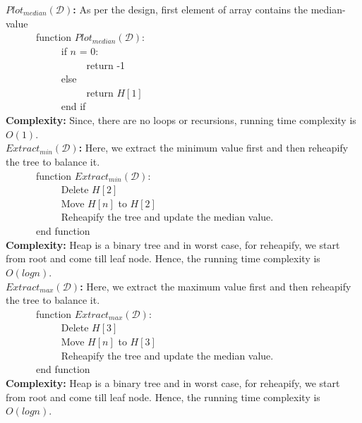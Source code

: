 \documentclass[12pt]{article}
\begin{document}
\begin{enumerate}
\begin{itemize}
\textbf{$Plot_{median}(\mathcal{D})$:} As per the design, first element of array contains the median-value\\
\verb|		|function $Plot_{median}(\mathcal{D})$:\\
\verb|		|\verb|		|if $n$ = 0:\\
\verb|		|\verb|		|\verb|		|return -1\\
\verb|		|\verb|		|else \\
\verb|		|\verb|		|\verb|		|return $H[1]$\\
\verb|		|\verb|		|end if\\
\textbf{Complexity:} Since, there are no loops or recursions, running time complexity is $O(1)$.\\

\textbf{$Extract_{min}(\mathcal{D})$:} Here, we extract the minimum value first and then reheapify the tree to balance it.\\
\verb|		|function $Extract_{min}(\mathcal{D})$:\\
\verb|		|\verb|		|Delete $H[2]$\\
\verb|		|\verb|		|Move $H[n]$ to $H[2]$\\
\verb|		|\verb|		|Reheapify the tree and update the median value.\\
\verb|		|end function\\
\textbf{Complexity:} Heap is a binary tree and in worst case, for reheapify, we start from root and come till leaf node. Hence, the running time complexity is $O(logn)$.\\

\textbf{$Extract_{max}(\mathcal{D})$:} Here, we extract the maximum value first and then reheapify the tree to balance it.\\
\verb|		|function $Extract_{max}(\mathcal{D})$:\\
\verb|		|\verb|		|Delete $H[3]$\\
\verb|		|\verb|		|Move $H[n]$ to $H[3]$\\
\verb|		|\verb|		|Reheapify the tree and update the median value.\\
\verb|		|end function\\
\textbf{Complexity:} Heap is a binary tree and in worst case, for reheapify, we start from root and come till leaf node. Hence, the running time complexity is $O(logn)$.\\


\end{itemize}
\end{enumerate}
\end{document}
